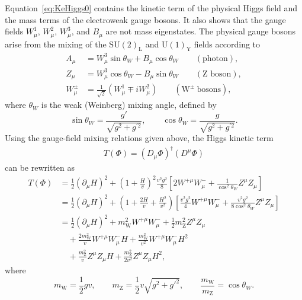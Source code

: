 Equation~\eqref{eq:KeHiggs0} contains the kinetic term of the physical Higgs field and the mass terms of the electroweak gauge bosons. It also shows that the gauge fields $W_\mu^1$, $W_\mu^2$, $W_\mu^3$, and $B_\mu$ are not mass eigenstates. The physical gauge bosons arise from the mixing of the $\mathrm{SU}(2)_{\text{L}}$ and $\mathrm{U}(1)_{\text{Y}}$ fields according to
\begin{align}
A_{\mu} &= W_{\mu}^{3} \sin \theta_{W} + B_{\mu} \cos \theta_{W}
\qquad (\text{photon}), \label{eq:photon}\\
Z_{\mu} &= W_{\mu}^{3} \cos \theta_{W} - B_{\mu} \sin \theta_{W}
\qquad (\text{Z boson}), \label{eq:zboson} \\
W_{\mu}^{\pm} &= \frac{1}{\sqrt{2}}
\left(
W_{\mu}^{1} \mp i W_{\mu}^{2}
\right)
\qquad (\text{W}^{\pm}\ \text{bosons}),
\label{eq:bosons}
\end{align}
where $\theta_W$ is the weak (Weinberg) mixing angle, defined by
\begin{equation}
\sin \theta_{W} = \frac{g'}{\sqrt{g^{2}+g^{\prime 2}}},
\qquad
\cos \theta_{W} = \frac{g}{\sqrt{g^{2}+g^{\prime 2}}}.
\end{equation}
Using the gauge-field mixing relations given above, the Higgs kinetic term
\begin{align}
T(\Phi) = (D_{\mu}\Phi)^{\dagger}(D^{\mu}\Phi)
\end{align}
can be rewritten as
\begin{equation}
\label{eq:lag_ew_Higgs_T}
\begin{aligned}
T(\Phi)
&=
\frac{1}{2} (\partial_{\mu} H)^2
+ \left(1+\frac{H}{v}\right)^2
\frac{v^2 g^2}{8}
\left[
2 W^{+\mu} W_{\mu}^{-}
+
\frac{1}{\cos^2\theta_W} Z^{\mu} Z_{\mu}
\right] \\
&=
\frac{1}{2} (\partial_{\mu} H)^2
+
\left(1 + \frac{2H}{v} + \frac{H^2}{v^2}\right)
\left[
\frac{v^2 g^2}{4} W^{+\mu} W_{\mu}^{-}
+
\frac{v^2 g^2}{8 \cos^2\theta_W} Z^{\mu} Z_{\mu}
\right] \\
&=
\frac{1}{2} (\partial_{\mu} H)^2
+ m_{\text{W}}^2 W^{+\mu} W_{\mu}^{-}
+ \frac{1}{2} m_{\text{Z}}^2 Z^{\mu} Z_{\mu} \\
&\quad
+ \frac{2 m_{\text{W}}^2}{v} W^{+\mu} W_{\mu}^{-} H
+ \frac{m_{\text{W}}^2}{v^2} W^{+\mu} W_{\mu}^{-} H^2 \\
&\quad
+ \frac{m_{\text{Z}}^2}{v} Z^{\mu} Z_{\mu} H
+ \frac{m_{\text{Z}}^2}{2 v^2} Z^{\mu} Z_{\mu} H^2 ,
\end{aligned}
\end{equation}
where
\begin{equation}
m_{\text{W}} = \frac{1}{2} g v,
\qquad
m_{\text{Z}} = \frac{1}{2} v \sqrt{g^2 + g'^2},
\qquad
\frac{m_{\text{W}}}{m_{\text{Z}}} = \cos\theta_W .
\end{equation}
